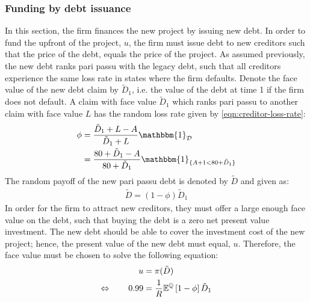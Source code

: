 \documentclass[main.tex]{subfiles}
\begin{document}
    \subsubsection{Funding by debt issuance}
    \label{sec:example-risk-free-project-debt-issuance}
        In this section, the firm finances the new project by issuing new debt.
        In order to fund the upfront of the project, $u$, 
        the firm must issue debt to new creditors such that the price of the debt, 
        equals the price of the project.
        As assumed previously, the new debt ranks pari passu with the legacy debt, 
        such that all creditors experience the same loss rate in states where the firm defaults.
        Denote the face value of the new debt claim by $\tilde{D}_{1}$, 
        i.e. the value of the debt at time 1 if the firm does not default. 
        A claim with face value $\tilde{D}_{1}$ which ranks pari passu to another claim 
        with face value $L$ has the random loss rate given by \cref{eqn:creditor-loss-rate}:
            \begin{align*}
                \phi
                &=
                    \frac{
                        \tilde{D}_{1} + L - A
                    }{
                        \tilde{D}_{1} + L
                    }
                    \mathbbm{1}_{\mathcal{D}}
                \nonumber \\
                &=
                    \frac{
                        \num{80} + \tilde{D}_{1} - A
                    }{
                        \num{80} + \tilde{D}_{1}
                    }
                    \mathbbm{1}_{\{A + \num{1} < \num{80} + \tilde{D}_{1}\}} 
            \end{align*}
        The random payoff of the new pari passu debt is denoted by $\tilde{D}$ and given as:
            \begin{align*}
                \tilde{D}
                    = (1 - \phi)\tilde{D}_{1}
            \end{align*}
        In order for the firm to attract new creditors,
        they must offer a large enough face value on the debt, 
        such that buying the debt is a zero net present value investment.
        The new debt should be able to cover the investment cost of the new project;
        hence, the present value of the new debt must equal, $u$.
        Therefore, the face value must be chosen to solve the following equation:
            \begin{align*}
                u &= \pi(\tilde{D}) \\
                \Leftrightarrow  \qquad
                \num{0.99} 
                &= 
                    \frac{1}{R}
                    \mathbb{E}^{\mathbb{Q}}\left[
                        1 - \phi
                    \right] 
                    \tilde{D}_{1}
            \end{align*}
\end{document}
